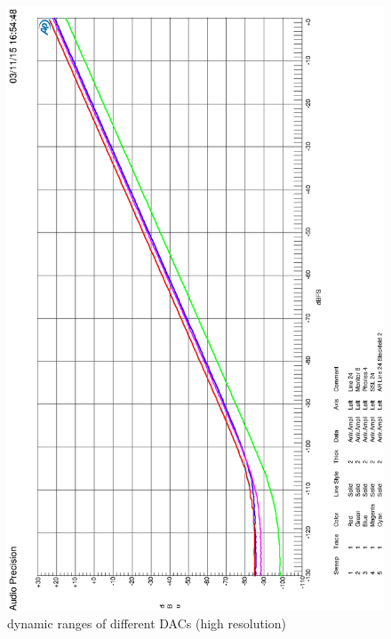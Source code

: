 \documentclass[11pt]{report}
\begin{document}
\begin{appendix}
\begin{figure}[htbp]
\begin{center}
\includegraphics[width=14cm,keepaspectratio=true]{HQDynamikvergleich}
\caption{dynamic ranges of different DACs (high resolution)}
\label{Abb.:1}
\end{center}
\end{figure}


\end{appendix}
\end{document}
